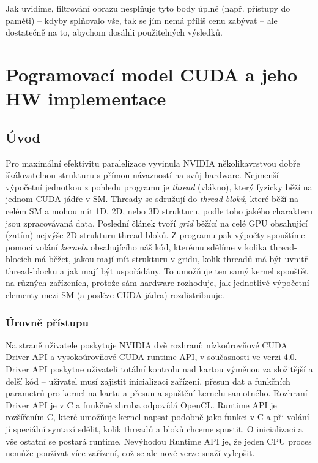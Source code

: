         Jak uvidíme, filtrování obrazu nesplňuje tyto body úplně (např. přístupy do paměti) -- kdyby splňovalo vše, tak se jím nemá příliš cenu zabývat -- ale dostatečně na to, abychom dosáhli použitelných výsledků.

\section{Pogramovací model CUDA a jeho HW implementace}

    \subsection{Úvod}
    Pro maximální efektivitu paralelizace vyvinula NVIDIA několikavrstvou dobře škálovatelnou strukturu s přímou návazností na svůj hardware. Nejmenší výpočetní jednotkou z pohledu programu je \emph{thread} (vlákno), který fyzicky běží na jednom CUDA-jádře v SM. Thready se sdružují do \emph{thread-bloků}, které běží na celém SM a mohou mít 1D, 2D, nebo 3D strukturu, podle toho jakého charakteru jsou zpracovávaná data. Poslední článek tvoří \emph{grid} běžící na celé GPU obsahující (zatím) nejvýše 2D strukturu thread-bloků. Z programu pak výpočty spouštíme pomocí volání \emph{kernelu} obsahujícího náš kód, kterému sdělíme v kolika thread-blocích má běžet, jakou mají mít strukturu v gridu, kolik threadů má být uvnitř thread-blocku a jak mají být uspořádány. To umožňuje ten samý kernel spouštět na různých zařízeních, protože sám hardware rozhoduje, jak jednotlivé výpočetní elementy mezi SM (a posléze CUDA-jádra) rozdistribuuje.

    \subsubsection{Úrovně přístupu}

    Na straně uživatele poskytuje NVIDIA dvě rozhraní: nízkoúrovňové CUDA Driver API a vysokoúrovňové CUDA runtime API, v současnosti ve verzi 4.0. Driver API poskytne uživateli totální kontrolu nad kartou výměnou za složitější a delší kód -- uživatel musí zajistit inicializaci zařízení, přesun dat a funkčních parametrů pro kernel na kartu a přesun a spuštění kernelu samotného. Rozhraní Driver API je v C a funkčně zhruba odpovídá OpenCL. Runtime API je rozšířením C, které umožňuje kernel napsat podobně jako funkci v C a při volání jí speciální syntaxí sdělit, kolik threadů a bloků chceme spustit. O inicializaci a vše ostatní se postará runtime. Nevýhodou Runtime API je, že jeden CPU proces nemůže používat více zařízení, což se ale nové verze snaží vylepšit.

